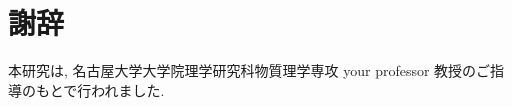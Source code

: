 \documentclass[thesis]{subfiles}
\begin{document}
\chapter*{謝辞}

本研究は, 名古屋大学大学院理学研究科物質理学専攻 your professor 教授のご指導のもとで行われました.
\end{document}

